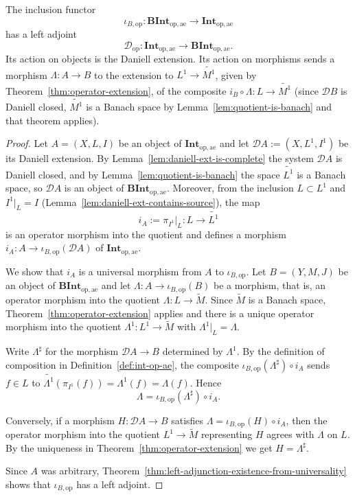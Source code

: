 \begin{theorem}\label{thm:operator-main-theorem}
  The inclusion functor
  \[
    \iota_{B,\mathrm{op}}:
    \mathbf{BInt}_{\mathrm{op},\mathrm{ae}}
    \to
    \mathbf{Int}_{\mathrm{op},\mathrm{ae}}
  \]
  has a left adjoint
  \[
    \mathcal{D}_{\mathrm{op}}:
    \mathbf{Int}_{\mathrm{op},\mathrm{ae}}
    \to
    \mathbf{BInt}_{\mathrm{op},\mathrm{ae}} .
  \]
  Its action on objects is the Daniell extension.
  Its action on morphisms sends a morphism $\Lambda:A\to B$ to the extension to
  $L^1\to\widetilde{M^1}$, given by
  Theorem~\ref{thm:operator-extension}, of the composite
  $i_B\circ\Lambda:L\to\widetilde{M^1}$
  (since $\mathcal{D}B$ is Daniell closed, $\widetilde{M^1}$ is a Banach space
  by Lemma~\ref{lem:quotient-is-banach} and that theorem applies).
\end{theorem}
\begin{proof}
  Let $A=(X,L,I)$ be an object of
  $\mathbf{Int}_{\mathrm{op},\mathrm{ae}}$ and let
  $\mathcal{D}A:=(X,L^1,I^1)$ be its Daniell extension.
  By Lemma~\ref{lem:daniell-ext-is-complete} the system $\mathcal{D}A$ is
  Daniell closed, and by Lemma~\ref{lem:quotient-is-banach} the space
  $\widetilde{L^1}$ is a Banach space, so $\mathcal{D}A$ is an object of
  $\mathbf{BInt}_{\mathrm{op},\mathrm{ae}}$.
  Moreover, from the inclusion $L\subset L^1$ and $I^1|_L=I$
  (Lemma~\ref{lem:daniell-ext-contains-source}), the map
  \[
    i_A:=\pi_{I^1}|_L:L\to\widetilde{L^1}
  \]
  is an operator morphism into the quotient and defines a morphism
  $i_A:A\to\iota_{B,\mathrm{op}}(\mathcal{D}A)$ of
  $\mathbf{Int}_{\mathrm{op},\mathrm{ae}}$.

  We show that $i_A$ is a universal morphism from $A$ to
  $\iota_{B,\mathrm{op}}$.
  Let $B=(Y,M,J)$ be an object of
  $\mathbf{BInt}_{\mathrm{op},\mathrm{ae}}$ and let
  $\Lambda:A\to\iota_{B,\mathrm{op}}(B)$ be a morphism, that is, an operator
  morphism into the quotient $\Lambda:L\to\widetilde{M}$.
  Since $\widetilde{M}$ is a Banach space,
  Theorem~\ref{thm:operator-extension} applies and there is a unique operator
  morphism into the quotient $\Lambda^1:L^1\to\widetilde{M}$ with
  $\Lambda^1|_L=\Lambda$.

  Write $\Lambda^\sharp$ for the morphism $\mathcal{D}A\to B$ determined by
  $\Lambda^1$.
  By the definition of composition in
  Definition~\ref{def:int-op-ae}, the composite
  $\iota_{B,\mathrm{op}}(\Lambda^\sharp)\circ i_A$ sends $f\in L$ to
  $\widetilde{\Lambda^1}(\pi_{I^1}(f))=\Lambda^1(f)=\Lambda(f)$.
  Hence
  \[
    \Lambda=\iota_{B,\mathrm{op}}(\Lambda^\sharp)\circ i_A.
  \]

  Conversely, if a morphism $H:\mathcal{D}A\to B$ satisfies
  $\Lambda=\iota_{B,\mathrm{op}}(H)\circ i_A$, then the operator morphism into
  the quotient $L^1\to\widetilde{M}$ representing $H$ agrees with $\Lambda$ on
  $L$.
  By the uniqueness in Theorem~\ref{thm:operator-extension} we get
  $H=\Lambda^\sharp$.

  Since $A$ was arbitrary,
  Theorem~\ref{thm:left-adjunction-existence-from-universality} shows that
  $\iota_{B,\mathrm{op}}$ has a left adjoint.
\end{proof}

